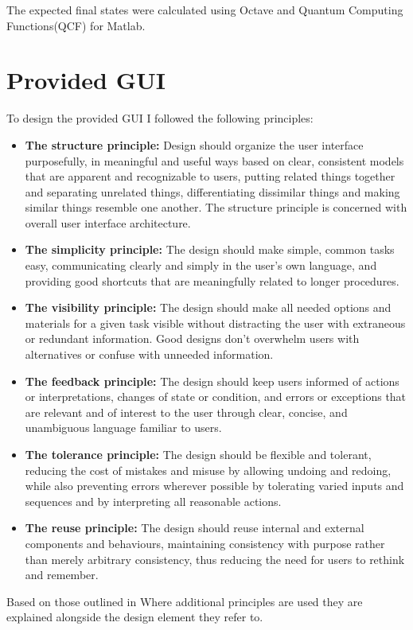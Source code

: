 The expected final states were calculated using Octave\cite{octweb} and Quantum Computing Functions(QCF) for Matlab\cite{qcfweb}.

\section{Provided GUI}
\label{sec:provgui}
To design the provided GUI I followed the following principles:
\begin{itemize}
 \item \textbf{The structure principle:} Design should organize the user interface purposefully, in meaningful and useful ways based on clear, consistent models that are apparent and recognizable to users, putting related things together and separating unrelated things, differentiating dissimilar things and making similar things resemble one another. 
The structure principle is concerned with overall user interface architecture.
\item \textbf{The simplicity principle:} The design should make simple, common tasks easy, communicating clearly and simply in the user's own language, and providing good shortcuts that are meaningfully related to longer procedures.
\item \textbf{The visibility principle:} The design should make all needed options and materials for a given task visible without distracting the user with extraneous or redundant information. 
Good designs don't overwhelm users with alternatives or confuse with unneeded information.
\item \textbf{The feedback principle:} The design should keep users informed of actions or interpretations, changes of state or condition, and errors or exceptions that are relevant and of interest to the user through clear, concise, and unambiguous language familiar to users.
\item \textbf{The tolerance principle:} The design should be flexible and tolerant, reducing the cost of mistakes and misuse by allowing undoing and redoing, while also preventing errors wherever possible by tolerating varied inputs and sequences and by interpreting all reasonable actions.
\item \textbf{The reuse principle:} The design should reuse internal and external components and behaviours, maintaining consistency with purpose rather than merely arbitrary consistency, thus reducing the need for users to rethink and remember.
\end{itemize}
Based on those outlined in \cite{constantine1999software}
Where additional principles are used they are explained alongside the design element they refer to.

